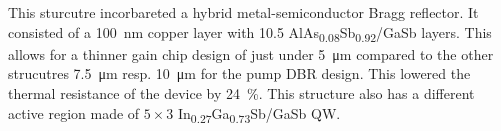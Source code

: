 This sturcutre incorbareted a hybrid metal-semiconductor Bragg reflector. It consisted of a  \qty{100}{\nm} copper layer with 10.5 AlAs\textsubscript{0.08}Sb\textsubscript{0.92}/GaSb layers. This allows for a thinner gain chip design of just under \qty{5}{\um} compared to the other strucutres \qty{7.5}{\um} resp. \qty{10}{\um} for the pump DBR design. This lowered the thermal resistance of the device by \qty{24}{\percent}. This structure also has a different active region made of $5\times3$ In\textsubscript{0.27}Ga\textsubscript{0.73}Sb/GaSb QW.
